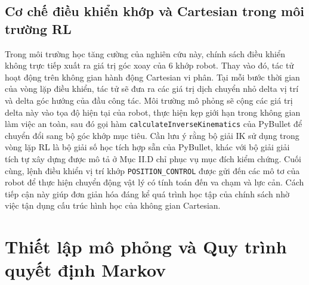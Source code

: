 \documentclass[conference]{IEEEtran}
\begin{document}
\subsection{Cơ chế điều khiển khớp và Cartesian trong môi trường RL}
Trong môi trường học tăng cường của nghiên cứu này, chính sách điều khiển không trực tiếp xuất ra giá trị góc xoay của 6 khớp robot. Thay vào đó, tác tử hoạt động trên không gian hành động Cartesian vi phân. Tại mỗi bước thời gian của vòng lặp điều khiển, tác tử sẽ đưa ra các giá trị dịch chuyển nhỏ delta vị trí và delta góc hướng của đầu công tác. Môi trường mô phỏng sẽ cộng các giá trị delta này vào tọa độ hiện tại của robot, thực hiện kẹp giới hạn trong không gian làm việc an toàn, sau đó gọi hàm \texttt{calculateInverseKinematics} của PyBullet để chuyển đổi sang bộ góc khớp mục tiêu. Cần lưu ý rằng bộ giải IK sử dụng trong vòng lặp RL là bộ giải số học tích hợp sẵn của PyBullet, khác với bộ giải giải tích tự xây dựng được mô tả ở Mục II.D chỉ phục vụ mục đích kiểm chứng. Cuối cùng, lệnh điều khiển vị trí khớp \texttt{POSITION\_CONTROL} được gửi đến các mô tơ của robot để thực hiện chuyển động vật lý có tính toán đến va chạm và lực cản. Cách tiếp cận này giúp đơn giản hóa đáng kể quá trình học tập của chính sách nhờ việc tận dụng cấu trúc hình học của không gian Cartesian.

\section{Thiết lập mô phỏng và Quy trình quyết định Markov}
\end{document}
